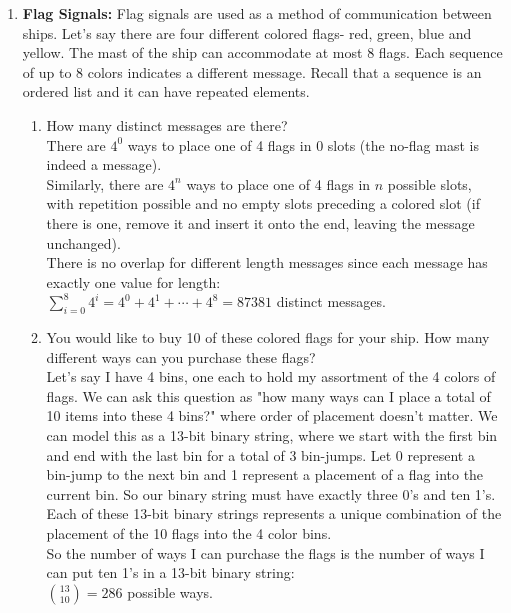 \documentclass[11pt,fleqn]{article}
\begin{document}
\begin{enumerate}
\newpage
\item \textbf{Flag Signals:}
Flag signals are used as a method of communication between ships. Let's say there are four different colored flags-
red, green, blue and yellow. The mast of the ship can accommodate at most 8 flags. Each sequence of up to 8 colors indicates a different message. Recall that a sequence is an ordered list
and it can have repeated elements. 
\begin{enumerate}
\item How many distinct messages are there? \\
There are $4^0$ ways to place one of 4 flags in 0 slots (the no-flag mast is indeed a message). \\
Similarly, there are $4^n$ ways to place one of 4 flags in $n$ possible slots, with repetition possible and no empty slots preceding a colored slot (if there is one, remove it and insert it onto the end, leaving the message unchanged). \\
There is no overlap for different length messages since each message has exactly one value for length: \\
$\displaystyle\sum\limits_{i=0}^{8} 4^i = 4^0 + 4^1 + \cdots + 4^8 = 87381$ distinct messages.
\item You would like to buy 10 of these colored flags for your ship. How many different ways can you purchase these flags? \\
Let's say I have 4 bins, one each to hold my assortment of the 4 colors of flags. We can ask this question as "how many ways can I place a total of 10 items into these 4 bins?" where order of placement doesn't matter. We can model this as a 13-bit binary string, where we start with the first bin and end with the last bin for a total of 3 bin-jumps. Let 0 represent a bin-jump to the next bin and 1 represent a placement of a flag into the current bin. So our binary string must have exactly three 0's and ten 1's. Each of these 13-bit binary strings represents a unique combination of the placement of the 10 flags into the 4 color bins. \\
So the number of ways I can purchase the flags is the number of ways I can put ten 1's in a 13-bit binary string: \\
$\binom{13}{10} = 286$ possible ways.
\end{enumerate}


\end{enumerate}
\end{document}
